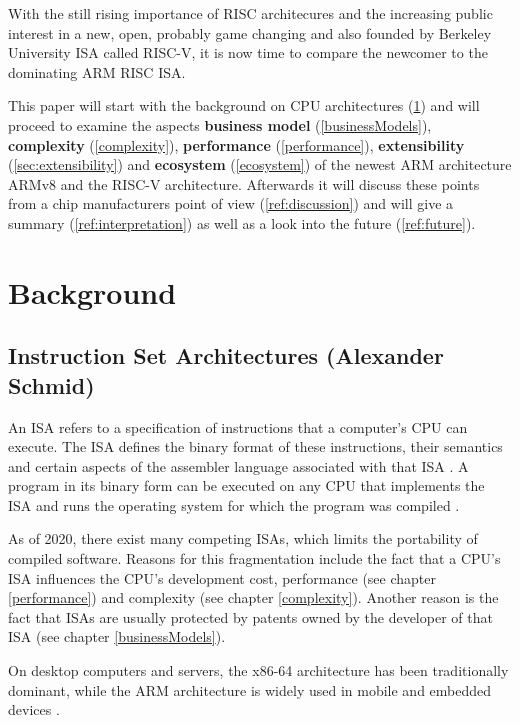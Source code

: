 \documentclass[conference]{IEEEtran}
\begin{document}
	With the still rising importance of \gls{RISC} architecures and the increasing public interest in a new, open, probably game changing and also founded by Berkeley University \gls{ISA} called RISC-V, it is now  time to compare the newcomer to the dominating ARM \gls{RISC} \gls{ISA}.

	This paper will start with the background on \gls{CPU} architectures (\ref{ref:background}) and will proceed to examine the aspects \textbf{business model} (\ref{businessModels}), \textbf{complexity} (\ref{complexity}), \textbf{performance} (\ref{performance}), \textbf{extensibility} (\ref{sec:extensibility}) and \textbf{ecosystem} (\ref{ecosystem}) of the newest ARM architecture ARMv8 and the RISC-V architecture. Afterwards it will discuss these points from a chip manufacturers point of view (\ref{ref:discussion}) and will give a summary (\ref{ref:interpretation}) as well as a look into the future (\ref{ref:future}).

\section{Background}
\label{ref:background}
	\subsection{Instruction Set Architectures (Alexander Schmid)}
	An \gls{ISA} refers to a specification of instructions that a computer's \gls{CPU} can execute.
	The \gls{ISA} defines the binary format of these instructions, their semantics and certain aspects of the assembler
	language associated with that \gls{ISA} \cite[page 20-23]{Stokes2006}.
	A program in its binary form can be executed on any \gls{CPU} that implements the \gls{ISA} and runs the operating system
	for which the program was compiled \cite[page 71]{Stokes2006}.

	As of 2020, there exist many competing \glspl{ISA}, which limits the portability of compiled software.
	Reasons for this fragmentation include the fact that a \gls{CPU}'s \gls{ISA} influences the \gls{CPU}'s development cost, performance (see chapter \ref{performance})
	and complexity (see chapter \ref{complexity}). Another reason is the fact that \glspl{ISA} are usually protected by patents owned by the developer of that \gls{ISA} (see chapter \ref{businessModels}).

	On desktop computers and servers, the x86-64 architecture has been traditionally dominant,
	while the ARM architecture is widely used in mobile and embedded devices \cite{Blem2013}.
\end{document}
